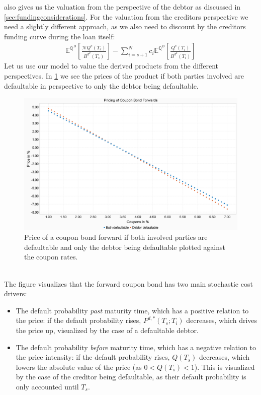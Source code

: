 \documentclass[12pt]{article}
\begin{document}
	 also gives us the valuation from the perspective of the debtor as discussed in \cref{sec:fundingconsiderations}. For the valuation from the creditors perspective we need a slightly different approach, as we also need to discount by the creditors funding curve during the loan itself:
	\begin{align*}
		\mathbb{E}^{\mathbb{Q}^B}\left[\frac{\mathcal{N}Q^c(T_s)}{B^{d^d}(T_s)}\right] - \sum_{i=s+1}^{N}c_i\mathbb{E}^{\mathbb{Q}^B}\left[\frac{Q^c(T_i)}{B^{d^d}(T_i)}\right]
	\end{align*}
	Let us use our model to value the derived products from the different perspectives. In \cref{fig:pricingcouponbondforwarddefversionbycoupons} we see the prices of the product if both parties involved are defaultable in perspective to only the debtor being defaultable.
	\begin{figure}[h!]
		\centering
		\includegraphics[width=0.7\linewidth]{figures/Today/PricingCouponBondForward_DefVersion_byCoupons}
		\caption{Price of a coupon bond forward if both involved parties are defaultable and only the debtor being defaultable plotted against the coupon rates.}
		\label{fig:pricingcouponbondforwarddefversionbycoupons}
	\end{figure}
	\\The figure visualizes that the forward coupon bond has two main stochastic cost drivers: 
	\begin{itemize}
		\item The default probability \emph{past} maturity time, which has a positive relation to the price: if the default probability rises, $P^{d,*}(T_s;T_i)$ decreases, which drives the price up, visualized by the case of a defaultable debtor.
		\item The default probability \emph{before} maturity time, which has a negative relation to the price intensity: if the default probability rises, $Q(T_s)$ decreases, which lowers the absolute value of the price (as $0 < Q(T_s) < 1$). This is visualized by the case of the creditor being defaultable, as their default probability is only accounted until $T_s$.
	\end{itemize}
\end{document}

